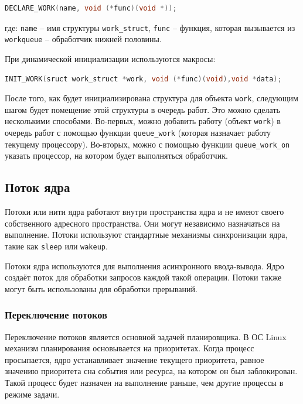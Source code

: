 \begin{lstlisting}[language=c, label=some-code, caption=статическая инициализация]
	DECLARE_WORK(name, void (*func)(void *));
\end{lstlisting}

где: \texttt{name} -- имя структуры \texttt{work\_struct}, \texttt{func} -- функция, которая вызывается из \texttt{workqueue} -- обработчик нижней половины.

При динамической инициализации используются макросы:

\begin{lstlisting}[language=c, label=some-code, caption=динамическая инициализация]
	INIT_WORK(sruct work_struct *work, void (*func)(void),void *data);
\end{lstlisting}

После того, как будет инициализирована структура для объекта \texttt{work}, следующим шагом будет помещение этой структуры в очередь работ. Это можно сделать несколькими способами. Во-первых, можно добавить работу (объект \texttt{work}) в очередь работ с помощью функции \texttt{queue\_work} (которая назначает работу текущему процессору). Во-вторых, можно с помощью функции \texttt{queue\_work\_on} указать процессор, на котором будет выполняться обработчик.

\subsection{Поток ядра}

Потоки или нити ядра работают внутри пространства ядра и не имеют своего собственного адресного пространства. Они могут независимо назначаться на выполнение. Потоки используют стандартные механизмы синхронизации ядра, такие как \texttt{sleep} или \texttt{wakeup}.

Потоки ядра используются для выполнения асинхронного ввода-вывода. Ядро создаёт поток для обработки запросов каждой такой операции. Потоки также могут быть использованы для обработки прерываний.

\subsubsection{Переключение потоков}

Переключение потоков является основной задачей планировщика. В ОС Linux механизм планирования основывается на приоритетах. Когда процесс просыпается, ядро устанавливает значение текущего приоритета, равное значению приоритета сна события или ресурса, на котором он был заблокирован. Такой процесс будет назначен на выполнение раньше, чем другие процессы в режиме задачи.

